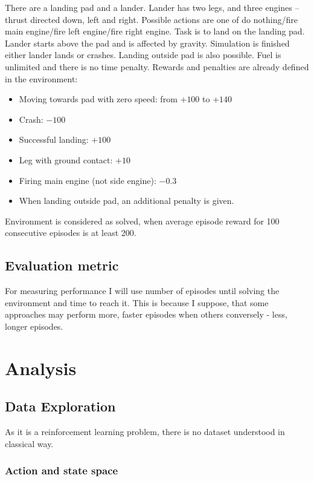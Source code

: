\documentclass[12pt]{article}
\begin{document}
There are a landing pad and a lander. Lander has two legs, and three engines – thrust directed down, left and right. Possible actions are one of do nothing/fire main engine/fire left engine/fire right engine.  Task is to land on the landing pad.  Lander starts above the pad and is affected by gravity. Simulation is finished either lander lands or crashes. Landing outside pad is also possible. Fuel is unlimited and there is no time penalty.
Rewards and penalties are already defined in the environment:
\begin{itemize}
\item Moving towards pad with zero speed: from $+100$ to $+140$
\item Crash: $-100$
\item Successful landing: $+100$
\item Leg with ground contact: $+10$
\item Firing main engine (not side engine): $-0.3$
\item When landing outside pad, an additional penalty is given.
\end{itemize}

Environment is considered as solved, when average episode reward for 100 consecutive episodes is at least 200.

\subsection{Evaluation metric}

For measuring performance I will use number of episodes until solving the environment and time to reach it. This is because I suppose, that some approaches may perform more, faster episodes when others conversely - less, longer episodes.

\section{Analysis}
\subsection{Data Exploration}

As it is a reinforcement learning problem, there is no dataset understood in classical way.

\subsubsection{Action and state space}
\end{document}
